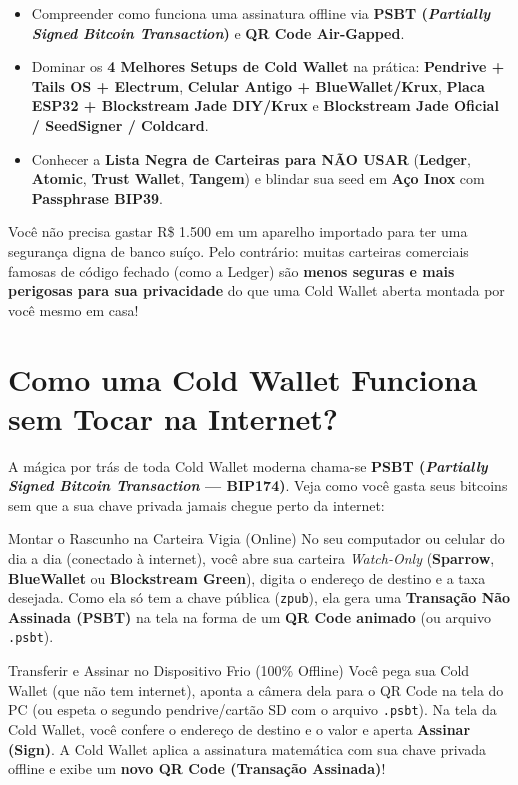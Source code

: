 \documentclass{pousadaguide}
\begin{document}
\begin{missao}
\begin{itemize}
  \item Compreender como funciona uma assinatura offline via \textbf{PSBT (\emph{Partially Signed Bitcoin Transaction})} e \textbf{QR Code Air-Gapped}.
  \item Dominar os \textbf{4 Melhores Setups de Cold Wallet} na prática: \textbf{Pendrive + Tails OS + Electrum}, \textbf{Celular Antigo + BlueWallet/Krux}, \textbf{Placa ESP32 + Blockstream Jade DIY/Krux} e \textbf{Blockstream Jade Oficial / SeedSigner / Coldcard}.
  \item Conhecer a \textbf{Lista Negra de Carteiras para NÃO USAR} (\textbf{Ledger}, \textbf{Atomic}, \textbf{Trust Wallet}, \textbf{Tangem}) e blindar sua seed em \textbf{Aço Inox} com \textbf{Passphrase BIP39}.
\end{itemize}
\end{missao}

Você não precisa gastar R\$ 1.500 em um aparelho importado para ter uma segurança digna de banco suíço. Pelo contrário: muitas carteiras comerciais famosas de código fechado (como a Ledger) são \textbf{menos seguras e mais perigosas para sua privacidade} do que uma Cold Wallet aberta montada por você mesmo em casa!

\section{Como uma Cold Wallet Funciona sem Tocar na Internet?}

A mágica por trás de toda Cold Wallet moderna chama-se \textbf{PSBT (\emph{Partially Signed Bitcoin Transaction} — BIP174)}. Veja como você gasta seus bitcoins sem que a sua chave privada jamais chegue perto da internet:

\begin{passo}{Montar o Rascunho na Carteira Vigia (Online)}
No seu computador ou celular do dia a dia (conectado à internet), você abre sua carteira \emph{Watch-Only} (\textbf{Sparrow}, \textbf{BlueWallet} ou \textbf{Blockstream Green}), digita o endereço de destino e a taxa desejada. Como ela só tem a chave pública (\texttt{zpub}), ela gera uma \textbf{Transação Não Assinada (PSBT)} na tela na forma de um \textbf{QR Code animado} (ou arquivo \texttt{.psbt}).
\end{passo}

\begin{passo}{Transferir e Assinar no Dispositivo Frio (100\% Offline)}
Você pega sua Cold Wallet (que não tem internet), aponta a câmera dela para o QR Code na tela do PC (ou espeta o segundo pendrive/cartão SD com o arquivo \texttt{.psbt}). Na tela da Cold Wallet, você confere o endereço de destino e o valor e aperta \textbf{Assinar (Sign)}. A Cold Wallet aplica a assinatura matemática com sua chave privada offline e exibe um \textbf{novo QR Code (Transação Assinada)}!
\end{passo}
\end{document}
